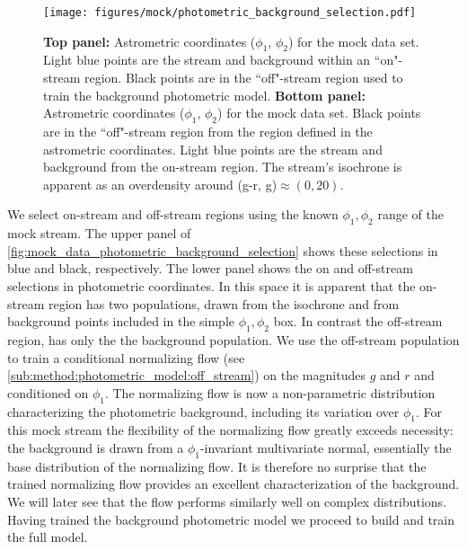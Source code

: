 \documentclass[twocolumn]{aastex631}
\begin{document}
        \begin{figure}
            \centering
            \texttt{[image: figures/mock/photometric\_background\_selection.pdf]}
            \caption{
                \textbf{Top panel:} Astrometric coordinates ($\phi_1$, $\phi_2$)
                for the mock data set.  Light blue points are the stream and
                background within an ``on"-stream region. Black points are in
                the ``off"-stream region used to train the background
                photometric model.
                \textbf{Bottom panel:} Astrometric coordinates ($\phi_1$,
                $\phi_2$) for the mock data set.  Black points are in the
                ``off"-stream region from the region defined in the astrometric
                coordinates.  Light blue points are the stream and background
                from the on-stream region. The stream's isochrone is apparent as
                an overdensity around (g-r, g)$\approx (0, 20)$.
            }
            \label{fig:mock_data_photometric_background_selection}
        \end{figure}
    
        We select on-stream and off-stream regions using the known $\phi_1,
        \phi_2$ range of the mock stream.  The upper panel of
        \autoref{fig:mock_data_photometric_background_selection} shows these
        selections in blue and black, respectively.  The lower panel shows the
        on and off-stream selections in photometric coordinates.  In this space
        it is apparent that the on-stream region has two populations, drawn from
        the isochrone and from background points included in the simple $\phi_1,
        \phi_2$ box.  In contrast the off-stream region, has only the the
        background population.  We use the off-stream population to train a
        conditional normalizing flow (see
        \autoref{sub:method:photometric_model:off_stream}) on the magnitudes $g$
        and $r$ and conditioned on $\phi_1$.  The normalizing flow is now a
        non-parametric distribution characterizing the photometric background,
        including its variation over $\phi_1$.  For this mock stream the
        flexibility of the normalizing flow greatly exceeds necessity: the
        background is drawn from a $\phi_1$-invariant multivariate normal,
        essentially the base distribution of the normalizing flow.  It is
        therefore no surprise that the trained normalizing flow provides an
        excellent characterization of the background.  We will later see that
        the flow performs similarly well on complex distributions.  Having
        trained the background photometric model we proceed to build and train
        the full model.
    
\end{document}
